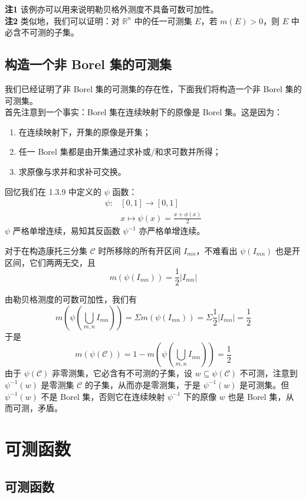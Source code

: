 \documentclass{ctexbook}
\newcommand{\R}{\mathbb{R}}
\newcommand{\ITEMS}{\begin{enumerate}[leftmargin=4em]}
\newcommand{\ITEME}{\end{enumerate}}
\begin{document}
{\bf 注1} 该例亦可以用来说明勒贝格外测度不具备可数可加性。\\

{\bf 注2} 类似地，我们可以证明：对 $\R^n$ 中的任一可测集 $E$，若 $m(E)>0$，则 $E$ 中必含不可测的子集。

\section{构造一个非 Borel 集的可测集}

我们已经证明了非 Borel 集的可测集的存在性，下面我们将构造一个非 Borel 集的可测集。\\

首先注意到一个事实：Borel 集在连续映射下的原像是 Borel 集。这是因为：
\ITEMS
\item 在连续映射下，开集的原像是开集；
\item 任一 Borel 集都是由开集通过求补或/和求可数并所得；
\item 求原像与求并和求补可交换。
\ITEME

回忆我们在 1.3.9 中定义的 $\psi$ 函数：
\[
\begin{aligned}
	\psi: &[0,1]\to [0,1]\\
	& x \mapsto \psi(x) = \frac{x+\phi(x)}{2}
\end{aligned}
\]
$\psi$ 严格单增连续，易知其反函数 $\psi^{-1}$ 亦严格单增连续。

对于在构造康托三分集 $\mathcal{C}$ 时所移除的所有开区间 $I_{mn}$，不难看出 $\psi(I_{mn})$ 也是开区间，它们两两无交，且
\[
m(\psi(I_{mn})) = \frac12\lvert I_{mn} \rvert
\]

由勒贝格测度的可数可加性，我们有
\[
m\left( \psi \left(\bigcup_{m,n} I_{mn}\right) \right) =\Sigma m(\psi(I_{mn}))=\Sigma \frac12\lvert I_{mn} \rvert = \frac12
\]
于是
\[
m\left(\psi(\mathcal{C})\right) =1-m\left( \psi \left(\bigcup_{m,n} I_{mn}\right) \right) = \frac12
\]
由于 $\psi(\mathcal{C})$ 非零测集，它必含有不可测的子集，设 $w \subseteq \psi(\mathcal{C})$ 不可测，注意到 $\psi^{-1}(w)$ 是零测集 $\mathcal{C}$ 的子集，从而亦是零测集，于是 $\psi^{-1}(w)$ 是可测集。但 $\psi^{-1}(w)$ 不是 Borel 集，否则它在连续映射 $\psi^{-1}$ 下的原像 $w$ 也是 Borel 集，从而可测，矛盾。



\chapter{可测函数}

\section{可测函数}
\end{document}
